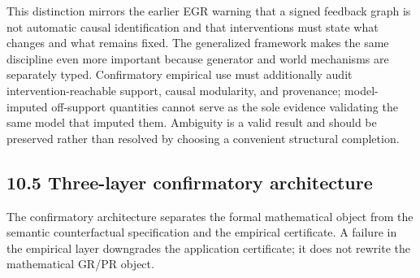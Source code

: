 \documentclass[10pt]{article}
\begin{document}
This distinction mirrors the earlier EGR warning that a signed feedback
graph is not automatic causal identification and that interventions must
state what changes and what remains fixed. The generalized framework
makes the same discipline even more important because generator and
world mechanisms are separately typed. Confirmatory empirical use must
additionally audit intervention-reachable support, causal modularity,
and provenance; model-imputed off-support quantities cannot serve as the
sole evidence validating the same model that imputed them. Ambiguity is
a valid result and should be preserved rather than resolved by choosing
a convenient structural completion.

\subsection{10.5 Three-layer confirmatory
architecture}\label{three-layer-confirmatory-architecture}

The confirmatory architecture separates the formal mathematical object from the semantic
counterfactual specification and the empirical certificate. A failure in
the empirical layer downgrades the application certificate; it does not
rewrite the mathematical GR/PR object.
\end{document}
